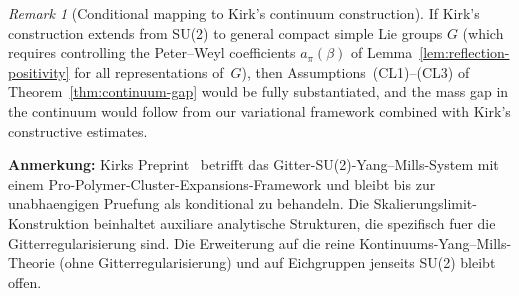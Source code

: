 \documentclass[12pt,a4paper]{article}
\theoremstyle{definition}
\theoremstyle{plain}
\theoremstyle{remark}
\newtheorem{remark}[definition]{Remark}
\begin{document}
\begin{remark}[Conditional mapping to Kirk's continuum construction]
If Kirk's construction extends from SU(2) to general compact simple
Lie groups $G$ (which requires controlling the Peter--Weyl coefficients
$a_\pi(\beta)$ of Lemma~\ref{lem:reflection-positivity} for all
representations of~$G$), then Assumptions~(CL1)--(CL3) of
Theorem~\ref{thm:continuum-gap} would be fully substantiated, and the
mass gap in the continuum would follow from our variational framework
combined with Kirk's constructive estimates.

\textbf{Anmerkung:} Kirks Preprint~\cite{Kirk2026} betrifft das Gitter-SU(2)-Yang--Mills-System mit einem Pro-Polymer-Cluster-Expansions-Framework und bleibt bis zur unabhaengigen Pruefung als konditional zu behandeln. Die Skalierungslimit-Konstruktion beinhaltet auxiliare analytische Strukturen, die spezifisch fuer die Gitterregularisierung sind. Die Erweiterung auf die reine Kontinuums-Yang--Mills-Theorie (ohne Gitterregularisierung) und auf Eichgruppen jenseits SU(2) bleibt offen.
\end{remark}
\end{document}
